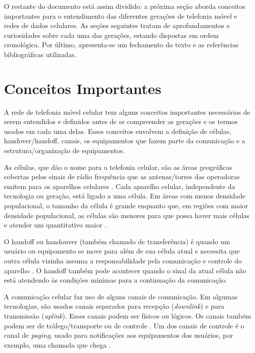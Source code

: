\documentclass[11pt,oneside,a4paper]{abntex2}
\begin{document}
O restante do documento está assim dividido: a próxima seção aborda conceitos importantes para o entendimento das diferentes gerações de telefonia móvel e redes de dados celulares. As seções seguintes tratam de aprofundamentos e curiosidades sobre cada uma das gerações, estando dispostas em ordem cronológica. Por último, apresenta-se um fechamento do texto e as referências bibliográficas utilizadas.

\section*{Conceitos Importantes}
\label{conceitos}

A rede de telefonia móvel celular tem alguns conceitos importantes necessários de serem entendidos e definidos antes de se compreender as gerações e os termos usados em cada uma delas. Esses conceitos envolvem a definição de células, handover/handoff, canais, os equipamentos que fazem parte da comunicação e a estrutura/organização de equipamentos.

As células, que dão o nome para a telefonia celular, são as áreas geográficas cobertas pelos sinais de rádio frequência que as antenas/torres das operadoras emitem para os aparelhos celulares \cite{def-celula}. Cada aparelho celular, independente da tecnologia ou geração, está ligado a uma célula. Em áreas com menos densidade populacional, o tamanho da célula é grande enquanto que, em regiões com maior densidade populacional, as células são menores para que possa haver mais células e atender um quantitativo maior \cite{livro-comer}.

O handoff ou handouver (também chamado de transferência) é quando um usuário ou equipamento se move para além de sua célula atual e necessita que outra célula vizinha assuma a responsabilidade pela comunicação e controle do aparelho \cite{def-handoff}. O handoff também pode acontecer quando o sinal da atual célula não está atendendo às condições mínimas para a continuação da comunicação.

A comunicação celular faz uso de alguns canais de comunicação. Em algumas tecnologias, são usados canais separados para recepção (\textit{downlink}) e para transmissão (\textit{uplink}). Esses canais podem ser físicos ou lógicos. Os canais também podem ser de tráfego/transporte ou de controle \cite{def-canal, tcc2}. Um dos canais de controle é o canal de \textit{paging}, usado para notificações aos equipamentos dos usuários, por exemplo, uma chamada que chega \cite{def-paging}.
\end{document}

